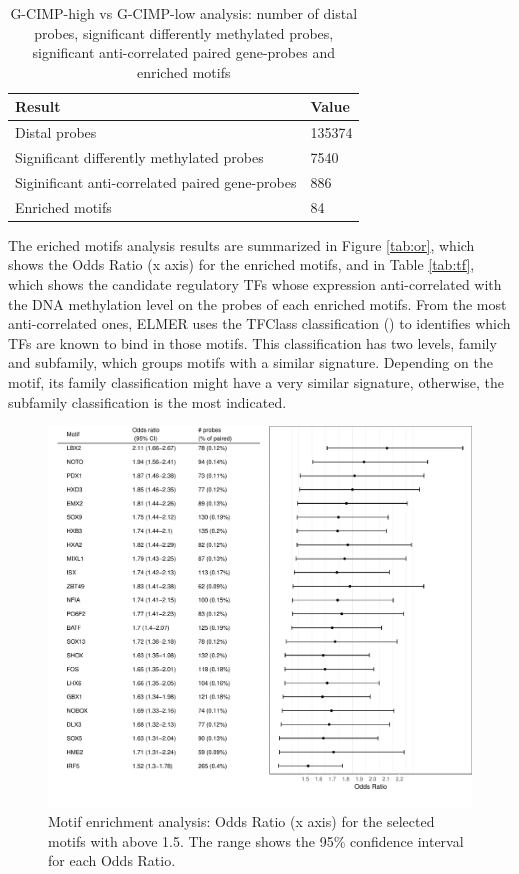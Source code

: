 \begin{table}[h!]
\centering
\caption[G-CIMP analysis: Summary results]{G-CIMP-high vs G-CIMP-low analysis:
number of distal probes, significant differently methylated probes, significant anti-correlated paired gene-probes and enriched motifs}
\label{gcimp.summary.results}
\begin{tabular}{@{}ll@{}}
\toprule
Result      & Value \\ \midrule
Distal probes       & 135374 \\
Significant differently methylated probes & 7540               \\
Siginificant anti-correlated paired gene-probes  & 886 \\
Enriched motifs & 84
\end{tabular}
\end{table}

The eriched motifs analysis results are summarized in Figure \ref{tab:or},
which shows the Odds Ratio (x axis) for the enriched motifs, and in Table  \ref{tab:tf},
which shows the candidate regulatory TFs whose expression anti-correlated
with the DNA methylation level on the probes of each enriched motifs.
 From the most anti-correlated ones, ELMER uses the TFClass
 classification (\cite{doi:10.1093/nar/gku1064}) to identifies
 which TFs are  known to bind in those motifs.
 This classification has two levels, family and subfamily,
  which groups motifs with a similar signature.
  Depending on the motif, its family classification might have a
  very similar signature, otherwise, the subfamily classification is the most indicated.

\begin{center}
\begin{figure}[h!]
\includegraphics[width=16cm]{images/hyper_motif_enrichment.pdf}
\caption[G-CIMP analysis: Odds Ratio plot]{Motif enrichment analysis: Odds Ratio (x axis) for the selected motifs with  above 1.5. The range shows the 95\% confidence interval for each Odds Ratio.}
\end{figure}
\label{tab:or}
\end{center}


